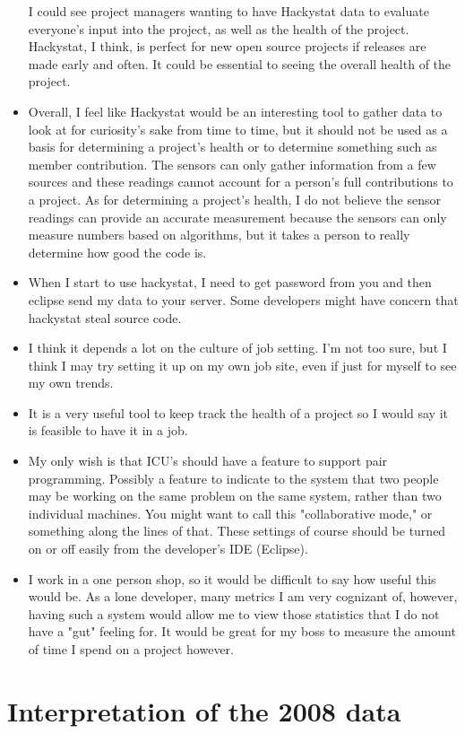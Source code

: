 \documentclass[11pt]{article}
\begin{document}
\begin{itemize}
I could see project managers wanting to have Hackystat data to evaluate everyone's input into the project, as well as the health of the project. Hackystat, I think, is perfect for new open source projects if releases are made early and often. It could be essential to seeing the overall health of the project.
\item Overall, I feel like Hackystat would be an interesting tool to gather data to look at for curiosity's sake from time to time, but it should not be used as a basis for determining a project's health or to determine something such as member contribution. The sensors can only gather information from a few sources and these readings cannot account for a person's full contributions to a project. As for determining a project's health, I do not believe the sensor readings can provide an accurate measurement because the sensors can only measure numbers based on algorithms, but it takes a person to really determine how good the code is.
\item When I start to use hackystat, I need to get password from you and then eclipse send my data to your server. Some developers might have concern that hackystat steal source code.
\item I think it depends a lot on the culture of job setting.  I'm not too sure, but I think I may try setting it up on my own job site, even if just for myself to see my own trends.
\item It is a very useful tool to keep track the health of a project so I would say it is feasible to have it in a job.
\item My only wish is that ICU's should have a feature to support pair programming. Possibly a feature to indicate to the system that two people may be working on the same problem on the same system, rather than two individual machines. You might want to call this "collaborative mode," or something along the lines of that. These settings of course should be turned on or off easily from the developer's IDE (Eclipse).  
\item I work in a one person shop, so it would be difficult to say how useful this would be.  As a lone developer, many metrics I am very cognizant of, however, having such a system would allow me to view those statistics that I do not have a "gut" feeling for.  It would be great for my boss to measure the amount of time I spend on a project however.
\end{itemize}
   
\section{Interpretation of the 2008 data}
\end{document}
